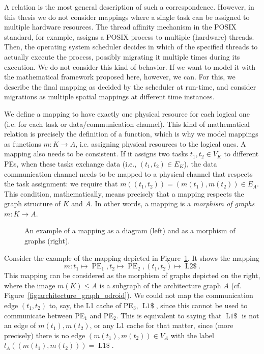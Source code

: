 A relation is the most general description of such a correspondence.
However, in this thesis we do not consider mappings where a single task can be assigned to multiple hardware resources.
The thread affinity mechanism in the POSIX standard, for example, assigns a POSIX process to multiple (hardware) threads.
Then, the operating system scheduler decides in which of the specified threads to actually execute the process, possibly migrating it multiple times during its execution.
We do not consider this kind of behavior.
If we want to model it with the mathematical framework proposed here, however, we can.
For this, we describe the final mapping as decided by the scheduler at run-time, and consider migrations as multiple spatial mappings at different time instances.

We define a mapping to have exactly one physical resource for each logical one (i.e. for each task or data/communication channel).
This kind of mathematical relation is precisely the definition of a function, which is why we model mappings as functions $m : K \rightarrow A$, i.e. assigning physical resources to the logical ones.
A mapping also needs to be consistent. If it assigns two tasks $t_1,t_2 \in V_K$ to different \acp{PE}, when these tasks exchange data (i.e., $(t_1,t_2) \in E_K$), the data communication channel needs to be mapped to a physical channel that respects the task assignment: we require that $m((t_1,t_2)) = (m(t_1),m(t_2)) \in E_A$.
This condition, mathematically, means precisely that a mapping respects the graph structure of $K$ and $A$.
In other words, a mapping is a \emph{morphism of graphs} $m : K \rightarrow A$.

\begin{figure}[h]
	\centering
\resizebox{0.8\textwidth}{!}{
   \begin{tikzpicture}
     
   \end{tikzpicture}
 }
   \caption{An example of a mapping as a diagram (left) and as a morphism of graphs (right).}
   \label{fig:mapping_example}
\end{figure}

Consider the example of the mapping depicted in Figure~\ref{fig:mapping_example}. It shows the mapping
\[ m : t_1 \mapsto \operatorname{PE}_1,t_2 \mapsto \operatorname{PE}_2, (t_1,t_2) \mapsto \operatorname{L2\$}.\]
This mapping can be considered as the morphism of graphs depicted on the right, where the image $m(K) \leq A$ is a subgraph of the architecture graph $A$ (cf. Figure~\ref{fig:architecture_graph_odroid}).
We could not map the communication edge $(t_1,t_2)$ to, say, the L1 cache of PE$_3$, $\operatorname{L1\$}$, since this cannot be used to communicate between PE$_1$ and PE$_2$.
This is equivalent to saying that $\operatorname{L1\$}$ is not an edge of $m(t_1),m(t_2)$, or any L1 cache for that matter, since (more precisely) there is no edge $(m(t_1),m(t_2)) \in V_A$ with the label $l_A((m(t_1),m(t_2))) = \operatorname{L1\$}$.


